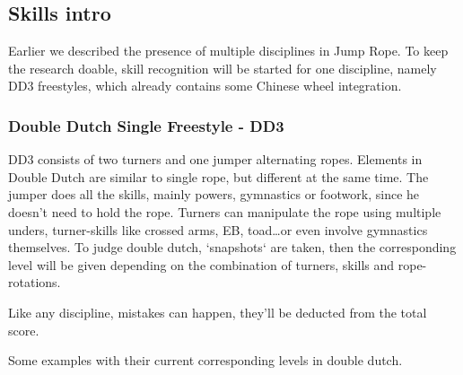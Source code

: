 \subsection{Skills intro}
\label{proposal-subsec:literature-basisskills}

Earlier we described the presence of multiple disciplines in Jump Rope. To keep the research doable, skill recognition will be started for one discipline, namely DD3 freestyles, which already contains some Chinese wheel integration.

\subsubsection{Double Dutch Single Freestyle - DD3}
\label{proposal-subsubsec:literature-dd3}

DD3 consists of two turners and one jumper alternating ropes. Elements in Double Dutch are similar to single rope, but different at the same time. The jumper does all the skills, mainly powers, gymnastics or footwork, since he doesn't need to hold the rope. Turners can manipulate the rope using multiple unders, turner-skills like crossed arms, EB, toad\dots or even involve gymnastics themselves.
To judge double dutch, `snapshots` are taken, then the corresponding level will be given depending on the combination of turners, skills and rope-rotations.

Like any discipline, mistakes can happen, they'll be deducted from the total score.

Some examples with their current corresponding levels in double dutch.

